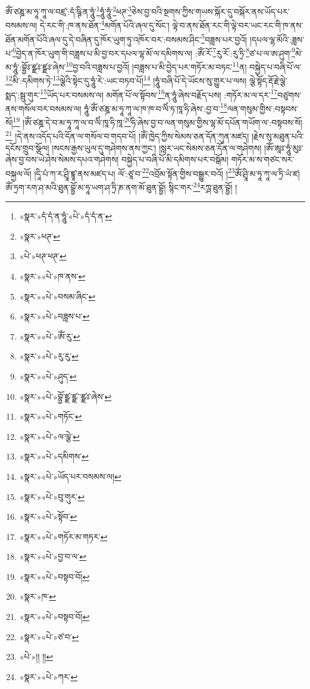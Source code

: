 ཨོཾ་ཙཎྜ་མ་ཧཱ་ཀཱ་ལ་བཛྲ་:དཾ་ཥྚི་ན་ཧཱུཾ་\footnote{«སྣར་»དཾ་དཾ་ན་ཧཱུཾ་«པེ་»དཾ་དཾ་ན་}ཧཱུཾ་ཧཱུཾ་\footnote{«སྣར་»ཕཊ་}ཕཊ་\footnote{«པེ་»ཕཊ་ཕཊ་}ཅེས་བྱ་བའི་སྔགས་ཀྱིས་གཡས་སྐོར་དུ་བསྐོར་ནས་ཡོད་པར་བསམས་ལ། དེ་རང་གི་:ཁ་ནས་ཐོན་\footnote{«སྣར་»«པེ་»ཁ་ནས་}མགོན་པོའི་ཞལ་དུ་སོང་། ལྟེ་བ་ནས་ཐོན་རང་གི་ལྟེ་བར་ཡང་རང་གི་ཁ་ནས་ཐོན་མགོན་པོའི་ཞལ་དུ་དེ་བཞིན་དུ་ཁོར་ཡུག་ཏུ་འཁོར་བར་:བསམས་ཤིང་\footnote{«སྣར་»«པེ་»བསམ་ཞིང་}བཟླས་པར་བྱའོ། །དཔལ་ལྷ་མོའི་:ཟླས་པ་\footnote{«སྣར་»«པེ་»བཟླས་པ་}བྱེད་ན་ཁོར་ཡུག་གི་བཟླས་པ་མི་བྱ་བར་དཔལ་ལྷ་མོ་ལ་དམིགས་ལ། :ཨོཾ་རོ་\footnote{«སྣར་»«པེ་»ཨོཾ་རུ་}རུ་རོ་:རུ་ཏྲི་\footnote{«སྣར་»«པེ་»རུ་རུ་}ཙ་པ་ལ་ཨ་ཤུག་\footnote{«སྣར་»«པེ་»ཤུད་}མེ་མ་ཧཱུཾ་:བྷྱོཿ་ཛྫཿ་ཛྫཿ་ཞེས་\footnote{«སྣར་»«པེ་»བྷྱོ་ཛྫ་ཛྫ་་ཛྫཿ་ཞེས་}བྱ་བའི་བཟླས་པ་བྱའོ། །བཟླས་པ་མི་བྱེད་པར་གཏོར་མ་བཏང་\footnote{«སྣར་»«པེ་»གཏོང་}ན། བསྐྱེད་པ་བཞི་པོ་ལ་\footnote{«སྣར་»«པེ་»ལ་ལྕེ་}མི་:དམིགས་ཏེ་\footnote{«སྣར་»«པེ་»དམིགས་}ལྕེའི་སྟེང་དུ་ཧཱུཾ་རེ་:ཡང་བཏབ་པོ།\footnote{«སྣར་»«པེ་»ཡོད་པར་བསམས་ལ།} །ཧཱུཾ་བཞི་པོ་དེ་ཡོངས་སུ་གྱུར་པ་ལས། ལྕེ་སྟོད་རྡོ་རྗེ་ལྕེ་སྨད་:སྦུ་གུར་\footnote{«སྣར་»«པེ་»བུ་གུར་}ཡོད་པར་བསམས་ལ། མགོན་པོ་ལ་སྟོབས་\footnote{«སྣར་»«པེ་»སྟོབ་}ན་ཧཱུཾ་ཞེས་བརྗོད་པས། :གཏོར་མ་ལ་དར་\footnote{«སྣར་»«པེ་»གཏོར་མ་གཏར་}བཙུགས་ནས་གསོལ་བར་བསམས་ལ། ཧཱུཾ་ཨོཾ་ཙཎྜ་མ་ཧཱ་ཀཱ་ལ་ཁ་ཁ་བ་ལིཾ་ཏ་ཁཱ་ཧི་ཞེས་:བྱ་བ་\footnote{«སྣར་»«པེ་»བྱ་བ་ལ་}ལན་གསུམ་གྱིས་:བསྟབས་སོ།\footnote{«སྣར་»«པེ་»བསྟབ་བོ།} །ཨོཾ་ཙཎྜ་དེ་བ་མ་ཧཱ་ཀཱ་ལ་བ་ལིཾ་ཁཱ་ཧི་ཁཱ་\footnote{«སྣར་»ཁ་}ཧི་ཞེས་བྱ་བ་ལན་གསུམ་གྱིས་ལྷ་མོ་དཔོན་གཡོག་ལ་:བསྟབས་སོ།\footnote{«སྣར་»«པེ་»བསྟབ་བོ།} །དེ་ནས་འདོད་པའི་དོན་ལ་གསོལ་བ་གདབ་པོ། །ཨོཾ་ཁྱེད་ཀྱིས་སེམས་ཅན་དོན་ཀུན་མཛད། །རྗེས་སུ་མཐུན་པའི་དངོས་གྲུབ་སྩོལ། །སངས་རྒྱས་ཡུལ་དུ་གཤེགས་ནས་ཀྱང་། །སླར་ཡང་སེམས་ཅན་དོན་ལ་གཤེགས། །ཨོཾ་ཨཱཿ་ཧཱུཾ་མུཿ་ཞེས་བྱ་བས་ཡེ་ཤེས་སེམས་དཔའ་གཤེགས། བསྐྱེད་པ་བཞི་པོ་མི་དམིགས་པར་བསྒོམ། གཏོར་མ་ས་གཙང་སར་བསྐྱལ་ལོ། །དཱི་པཾ་ཀ་ར་ཤྲཱི་ཛྙཱ་ནས་མཛད་པ། ལོ་:ཙཱ་བ་\footnote{«སྣར་»«པེ་»ཙ་བ་}འབྲོམ་སྟོན་གྱིས་བསྒྱུར་བའོ། །\footnote{«པེ་»།། །།}ཨོཾ་ཤྲཱི་མ་ཧཱ་ཀཱ་ལ་ཏྲི་ཡཾ་ཛ། ཨོཾ་ཏྲག་རག་ཤ་མའི་ཐུན་བྷྱོ་མ་ཧཱ་ཡག་ཤ་ཏྲི་ཎ་ནག་མོ་ཐུན་བྷྱོ། སྙིང་གར་\footnote{«སྣར་»«པེ་»ཀར་}རཀྴ་ཐུན་བྷྱོ། ། 